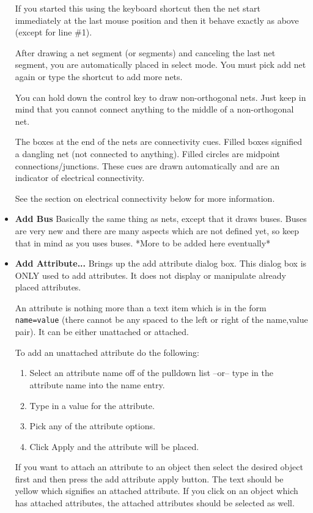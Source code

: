 \documentclass{article}
\begin{document}
\begin{itemize}
If you started this using the keyboard shortcut then the net start
immediately at the last mouse position and then it behave exactly as
above (except for line \#1).

After drawing a net segment (or segments) and canceling the last net
segment, you are automatically placed in select mode.  You must pick
add net again or type the shortcut to add more nets.

You can hold down the control key to draw non-orthogonal nets.  Just
keep in mind that you cannot connect anything to the middle of a
non-orthogonal net.

The boxes at the end of the nets are connectivity cues.  Filled boxes
signified a dangling net (not connected to anything).  Filled circles
are midpoint connections/junctions.  These cues are drawn
automatically and are an indicator of electrical connectivity.

See the section on electrical connectivity below for more information.

\item {\bf Add Bus} Basically the same thing as nets, except that it
  draws buses.  Buses are very new and there are many aspects which
  are not defined yet, so keep that in mind as you uses buses.  *More
  to be added here eventually*
  
\item {\bf Add Attribute...}  Brings up the add attribute dialog box.
  This dialog box is ONLY used to add attributes.  It does not display
  or manipulate already placed attributes.
  
  An attribute is nothing more than a text item which is in the form
  {\tt name=value} (there cannot be any spaced to the left or right of the
  name,value pair).  It can be either unattached or attached.

 To add an unattached attribute do the following:

 \begin{enumerate}
 \item Select an attribute name off of the pulldown list --or-- type
   in the attribute name into the name entry.
 \item Type in a value for the attribute.
 \item Pick any of the attribute options.
 \item Click Apply and the attribute will be placed.
 \end{enumerate}
 
 If you want to attach an attribute to an object then select the
 desired object first and then press the add attribute apply button.
 The text should be yellow which signifies an attached attribute.  If
 you click on an object which has attached attributes, the attached
 attributes should be selected as well.
 

\end{itemize}
\end{document}
